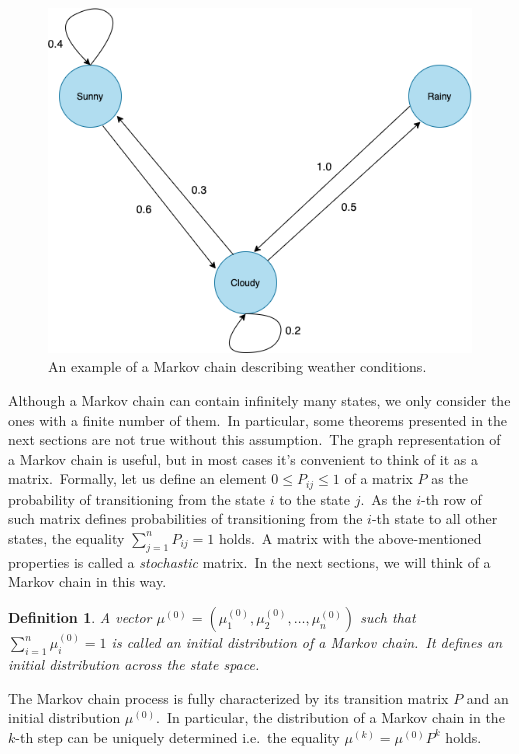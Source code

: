 \documentclass[shortabstract, english, lic]{iithesis}
\theoremstyle{default_theorem_style}\newtheorem{theorem}{Theorem}
\theoremstyle{default_theorem_style}\newtheorem{definition}{Definition}
\begin{document}
\begin{figure}[H]
\centering
\includegraphics[scale=0.43]{markov_chain}
\caption{An example of a Markov chain describing weather conditions.}
\label{fig:markov_chain}
\end{figure}

\noindent Although a Markov chain can contain infinitely many states, we only consider
the ones with a finite number of them.\ In particular, some theorems presented in the next sections
are not true without this assumption.\ The graph representation of a Markov chain is useful, but in most cases
it's convenient to think of it as a matrix.\ Formally, let us define an element $0 \leq P_{ij} \leq 1$ of a matrix
$P$ as the probability of transitioning from the state $i$ to the state $j$.\ As the $i$-th row of such matrix
defines probabilities of transitioning from the $i$-th  state to all other states, the equality
$\sum_{j = 1}^{n} P_{ij} = 1$ holds.\ A matrix with the above-mentioned properties is called a
\textit{stochastic} matrix.\ In the next sections, we will think of a Markov chain in this way.

\begin{definition}
A vector $\mu^{(0)} = (\mu^{(0)}_1, \mu^{(0)}_2, \dots, \mu^{(0)}_n)$ such that $\sum_{i=1}^{n} \mu^{(0)}_i = 1$
is called an \textit{initial distribution} of a Markov chain.\ It defines an initial distribution across the state space.

\end{definition}

\noindent The Markov chain process is fully characterized by its transition matrix $P$ and an initial
distribution $\mu^{(0)}$.\ In particular, the distribution of a Markov chain in the $k$-th step can be uniquely
determined i.e.\ the equality $\mu^{(k)} = \mu^{(0)}P^k$ holds.
\end{document}
